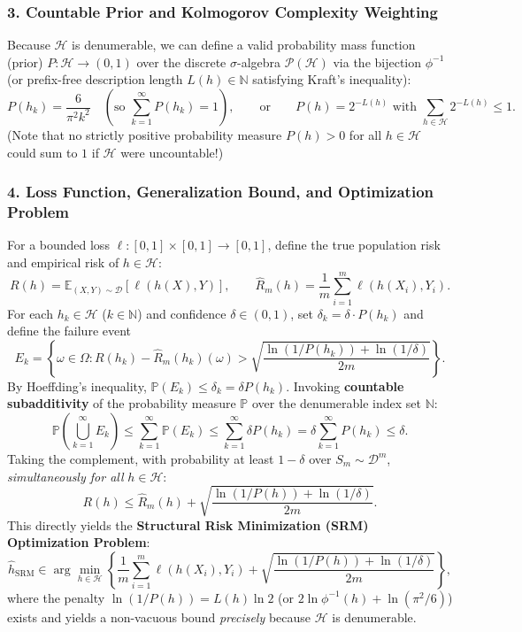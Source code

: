 \documentclass[11pt, letterpaper]{article}
\theoremstyle{definition}
\theoremstyle{remark}
\begin{document}
\subsubsection*{3. Countable Prior and Kolmogorov Complexity Weighting}
Because $\mathcal{H}$ is denumerable, we can define a valid probability mass function (prior) $P : \mathcal{H} \to (0, 1)$ over the discrete $\sigma$-algebra $\mathcal{P}(\mathcal{H})$ via the bijection $\phi^{-1}$ (or prefix-free description length $L(h) \in \mathbb{N}$ satisfying Kraft's inequality):
\[
P(h_k) = \frac{6}{\pi^2 k^2} \quad (\text{so } \sum_{k=1}^\infty P(h_k) = 1), \qquad \text{or} \qquad P(h) = 2^{-L(h)} \text{ with } \sum_{h \in \mathcal{H}} 2^{-L(h)} \leq 1.
\]
(Note that no strictly positive probability measure $P(h) > 0$ for all $h \in \mathcal{H}$ could sum to $1$ if $\mathcal{H}$ were uncountable!)

\subsubsection*{4. Loss Function, Generalization Bound, and Optimization Problem}
For a bounded loss $\ell : [0, 1] \times [0, 1] \to [0, 1]$, define the true population risk and empirical risk of $h \in \mathcal{H}$:
\[
R(h) = \mathbb{E}_{(X, Y) \sim \mathcal{D}}[\ell(h(X), Y)], \qquad \widehat{R}_m(h) = \frac{1}{m} \sum_{i=1}^m \ell(h(X_i), Y_i).
\]
For each $h_k \in \mathcal{H}$ ($k \in \mathbb{N}$) and confidence $\delta \in (0, 1)$, set $\delta_k = \delta \cdot P(h_k)$ and define the failure event
\[
E_k = \left\{ \omega \in \Omega : R(h_k) - \widehat{R}_m(h_k)(\omega) > \sqrt{\frac{\ln(1/P(h_k)) + \ln(1/\delta)}{2m}} \right\}.
\]
By Hoeffding's inequality, $\mathbb{P}(E_k) \leq \delta_k = \delta P(h_k)$. Invoking \textbf{countable subadditivity} of the probability measure $\mathbb{P}$ over the denumerable index set $\mathbb{N}$:
\[
\mathbb{P}\left(\bigcup_{k=1}^\infty E_k\right) \leq \sum_{k=1}^\infty \mathbb{P}(E_k) \leq \sum_{k=1}^\infty \delta P(h_k) = \delta \sum_{k=1}^\infty P(h_k) \leq \delta.
\]
Taking the complement, with probability at least $1 - \delta$ over $S_m \sim \mathcal{D}^m$, \textit{simultaneously for all} $h \in \mathcal{H}$:
\[
R(h) \leq \widehat{R}_m(h) + \sqrt{\frac{\ln(1/P(h)) + \ln(1/\delta)}{2m}}.
\]
This directly yields the \textbf{Structural Risk Minimization (SRM) Optimization Problem}:
\[
\hat{h}_{\mathrm{SRM}} \in \arg\min_{h \in \mathcal{H}} \left\{ \frac{1}{m} \sum_{i=1}^m \ell(h(X_i), Y_i) + \sqrt{\frac{\ln(1/P(h)) + \ln(1/\delta)}{2m}} \right\},
\]
where the penalty $\ln(1/P(h)) = L(h)\ln 2$ (or $2\ln \phi^{-1}(h) + \ln(\pi^2/6)$) exists and yields a non-vacuous bound \textit{precisely} because $\mathcal{H}$ is denumerable.
\end{document}
